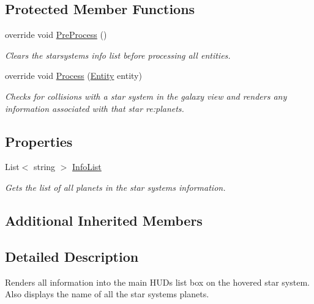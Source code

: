 \subsection*{Protected Member Functions}
\begin{DoxyCompactItemize}
\item 
override void \hyperlink{class_midnight_blue_1_1_galaxy_render_system_a269f042fe0c55e47f3b23cc1930ed71a}{Pre\+Process} ()
\begin{DoxyCompactList}\small\item\em Clears the starsystems info list before processing all entities. \end{DoxyCompactList}\item 
override void \hyperlink{class_midnight_blue_1_1_galaxy_render_system_aabbf61a4bcfb7c026d2d0c9fbe90569f}{Process} (\hyperlink{class_m_b2_d_1_1_entity_component_1_1_entity}{Entity} entity)
\begin{DoxyCompactList}\small\item\em Checks for collisions with a star system in the galaxy view and renders any information associated with that star re\+:planets. \end{DoxyCompactList}\end{DoxyCompactItemize}
\subsection*{Properties}
\begin{DoxyCompactItemize}
\item 
List$<$ string $>$ \hyperlink{class_midnight_blue_1_1_galaxy_render_system_a2f252c64ec38b5bcf20c6b276fd5809b}{Info\+List}
\begin{DoxyCompactList}\small\item\em Gets the list of all planets in the star system\textquotesingle{}s information. \end{DoxyCompactList}\end{DoxyCompactItemize}
\subsection*{Additional Inherited Members}


\subsection{Detailed Description}
Renders all information into the main H\+UD\textquotesingle{}s list box on the hovered star system. Also displays the name of all the star systems planets. 



